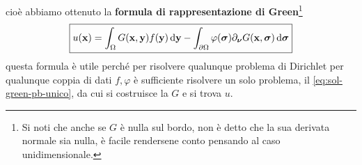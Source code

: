 cioè abbiamo ottenuto la \textbf{formula di rappresentazione di Green}\footnote{Si noti che anche se $G$ è nulla sul bordo, non è detto che la sua derivata normale sia nulla, è facile rendersene conto pensando al caso unidimensionale.}
\begin{equation*}
    \boxed{u(\mathbf{x}) =\int _{\Omega } G(\mathbf{x},\mathbf{y}) f(\mathbf{y}) \,\mathrm d \mathbf{y}-\int _{\partial \Omega } \varphi (\bm{\sigma}) \partial_{\bm{\nu}} G(\mathbf{x},\bm{\sigma}) \,\mathrm d \bm{\sigma} }
\end{equation*}
questa formula è utile perché per risolvere qualunque problema di Dirichlet per qualunque coppia di dati $f,\varphi $ è sufficiente risolvere un solo problema, il \eqref{eq:sol-green-pb-unico}, da cui si costruisce la $G$ e si trova $u$.